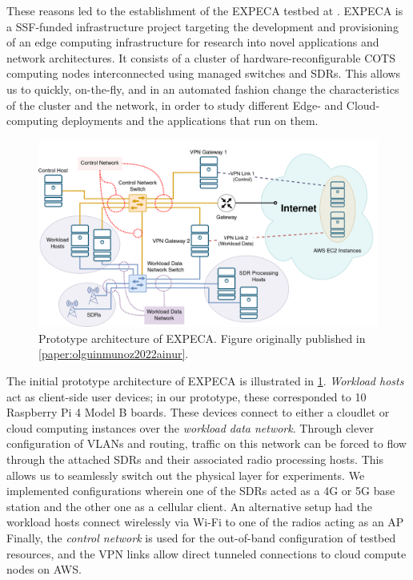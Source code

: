 These reasons led to the establishment of the \gls{EXPECA} testbed at .
\gls{EXPECA} is a \gls{SSF}-funded infrastructure project targeting the development and provisioning of an edge computing infrastructure for research into novel applications and network architectures.
It consists of a cluster of hardware-reconfigurable \gls{COTS} computing nodes interconnected using managed switches and \glspl{SDR}.
This allows us to quickly, on-the-fly, and in an automated fashion change the characteristics of the cluster and the network, in order to study different Edge- and Cloud-computing deployments and the applications that run on them.

\begin{figure}
    \centering
    \includegraphics[width=\textwidth]{publications/2022Ainur/figures/network}
    \caption{
        Prototype architecture of \acs{EXPECA}.
        Figure originally published in \cref{paper:olguinmunoz2022ainur}.
    }\label{fig:expeca}
\end{figure}

The initial prototype architecture of \gls{EXPECA} is illustrated in \cref{fig:expeca}.
\emph{Workload hosts} act as client-side user devices;
in our prototype, these corresponded to \num{10} Raspberry Pi 4 Model B boards.
These devices connect to either a cloudlet or cloud computing instances over the \emph{workload data network}.
Through clever configuration of \acsp{VLAN} and routing, traffic on this network can be forced to flow through the attached \acsp{SDR} and their associated radio processing hosts.
This allows us to seamlessly switch out the physical layer for experiments.
We implemented configurations wherein one of the \glspl{SDR} acted as a 4G or 5G base station and the other one as a cellular client.
An alternative setup had the workload hosts connect wirelessly via Wi-Fi to one of the radios acting as an \gls{AP}
Finally, the \emph{control network} is used for the out-of-band configuration of testbed resources, and the \acs{VPN} links allow direct tunneled connections to cloud compute nodes on \acs{AWS}.


